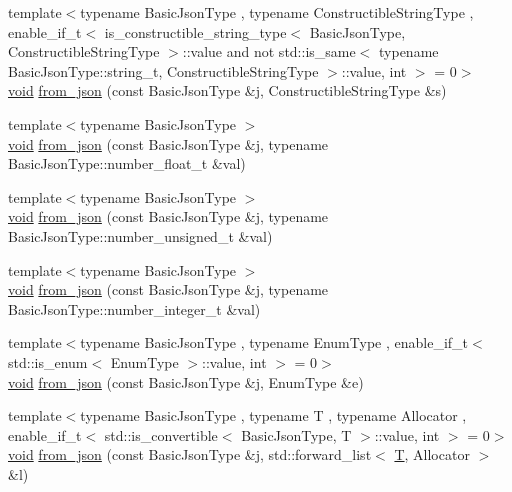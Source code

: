 \begin{DoxyCompactItemize}
\item 
{\footnotesize template$<$typename Basic\+Json\+Type , typename Constructible\+String\+Type , enable\+\_\+if\+\_\+t$<$ is\+\_\+constructible\+\_\+string\+\_\+type$<$ Basic\+Json\+Type, Constructible\+String\+Type $>$\+::value and not std\+::is\+\_\+same$<$ typename Basic\+Json\+Type\+::string\+\_\+t, Constructible\+String\+Type $>$\+::value, int $>$  = 0$>$ }\\\mbox{\hyperlink{namespacenlohmann_1_1detail_a59fca69799f6b9e366710cb9043aa77d}{void}} \mbox{\hyperlink{namespacenlohmann_1_1detail_a2932f2bc2943dac6d51669312f4fc0f5}{from\+\_\+json}} (const Basic\+Json\+Type \&j, Constructible\+String\+Type \&s)
\item 
{\footnotesize template$<$typename Basic\+Json\+Type $>$ }\\\mbox{\hyperlink{namespacenlohmann_1_1detail_a59fca69799f6b9e366710cb9043aa77d}{void}} \mbox{\hyperlink{namespacenlohmann_1_1detail_a7cb5dd7d46a60e65f9a8e0873b3f7dd8}{from\+\_\+json}} (const Basic\+Json\+Type \&j, typename Basic\+Json\+Type\+::number\+\_\+float\+\_\+t \&val)
\item 
{\footnotesize template$<$typename Basic\+Json\+Type $>$ }\\\mbox{\hyperlink{namespacenlohmann_1_1detail_a59fca69799f6b9e366710cb9043aa77d}{void}} \mbox{\hyperlink{namespacenlohmann_1_1detail_ace4d5680ba413d9fd897ccb5d9c61a1c}{from\+\_\+json}} (const Basic\+Json\+Type \&j, typename Basic\+Json\+Type\+::number\+\_\+unsigned\+\_\+t \&val)
\item 
{\footnotesize template$<$typename Basic\+Json\+Type $>$ }\\\mbox{\hyperlink{namespacenlohmann_1_1detail_a59fca69799f6b9e366710cb9043aa77d}{void}} \mbox{\hyperlink{namespacenlohmann_1_1detail_a047d881e611fcac709dc318f730a1732}{from\+\_\+json}} (const Basic\+Json\+Type \&j, typename Basic\+Json\+Type\+::number\+\_\+integer\+\_\+t \&val)
\item 
{\footnotesize template$<$typename Basic\+Json\+Type , typename Enum\+Type , enable\+\_\+if\+\_\+t$<$ std\+::is\+\_\+enum$<$ Enum\+Type $>$\+::value, int $>$  = 0$>$ }\\\mbox{\hyperlink{namespacenlohmann_1_1detail_a59fca69799f6b9e366710cb9043aa77d}{void}} \mbox{\hyperlink{namespacenlohmann_1_1detail_a5440d650150d01e8015133521351b459}{from\+\_\+json}} (const Basic\+Json\+Type \&j, Enum\+Type \&e)
\item 
{\footnotesize template$<$typename Basic\+Json\+Type , typename T , typename Allocator , enable\+\_\+if\+\_\+t$<$ std\+::is\+\_\+convertible$<$ Basic\+Json\+Type, T $>$\+::value, int $>$  = 0$>$ }\\\mbox{\hyperlink{namespacenlohmann_1_1detail_a59fca69799f6b9e366710cb9043aa77d}{void}} \mbox{\hyperlink{namespacenlohmann_1_1detail_a5cfb765aad92795abd7fda29d017272a}{from\+\_\+json}} (const Basic\+Json\+Type \&j, std\+::forward\+\_\+list$<$ \mbox{\hyperlink{_keyboard_event_8h_adf1f3edb9115acb0a1e04209b7a9937b}{T}}, Allocator $>$ \&l)

\end{DoxyCompactItemize}
